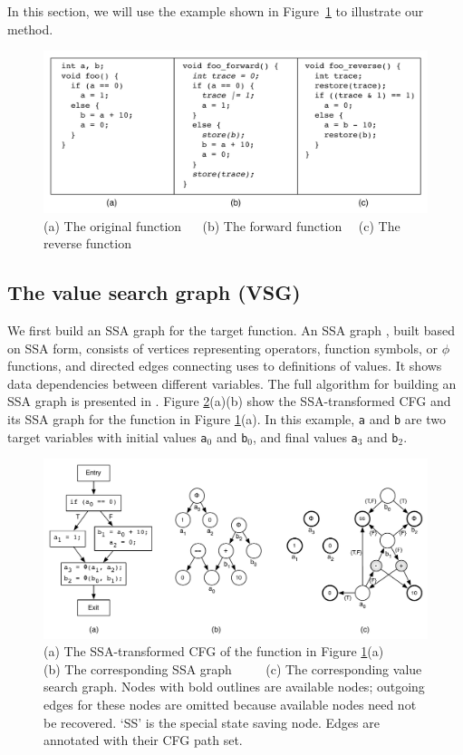In this section, we will use the example shown in Figure~\ref{fig:code_example} to illustrate our method.


\begin{figure}
\centering
\includegraphics[width=400pt]{figures1/CodeExample.pdf}
\caption{(a) The original function $\quad$ (b) The forward function$\quad$ (c) The reverse function}
\label{fig:code_example}
\end{figure}

\subsection{The value search graph (VSG)}
We first build an SSA graph for the target function.
An SSA graph \cite{Alpern1988,Cooper2001}, built based on SSA form, consists of vertices representing operators, function symbols, or $\phi$ functions, and directed edges connecting uses to definitions of values. It shows data dependencies between different variables. 
The full algorithm for building an SSA graph is presented in \cite{Muchnick}. 
Figure \ref{fig:VSG}(a)(b) show the SSA-transformed CFG and its SSA graph for the function in Figure \ref{fig:code_example}(a). In this example, \texttt{a} and \texttt{b} are two target variables with initial values \texttt{a$_0$} and \texttt{b$_0$}, and final values \texttt{a$_3$} and \texttt{b$_2$}.

\begin{figure}
\centering
\includegraphics[width=400pt]{figures1/CFG.pdf}
\caption{(a) The SSA-transformed CFG of the function in Figure \ref{fig:code_example}(a)$\quad\quad$ (b) The corresponding SSA graph $\quad\quad$ (c) The corresponding value search graph. Nodes with bold outlines are available nodes; outgoing edges for these nodes are omitted because available nodes need not be recovered. `SS' is the special state saving node. Edges are annotated with their CFG path set.}
\label{fig:VSG}
\end{figure}




